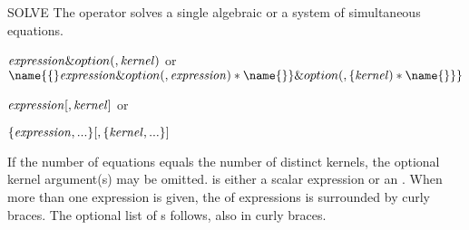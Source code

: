 \begin{Operator}{SOLVE}
The  operator solves a single algebraic  or a
system of simultaneous equations.
\begin{TEX}
\begin{Syntax}
\(\meta{expression}\&option(, \meta{kernel})\) or \\
 \(\name{\{}\meta{expression}\&option( ,\meta{expression})
 \optional\name{\}}
	  \&option(,\{\meta{kernel})\optional\name{\}\}}\)
\end{Syntax}
\end{TEX}
\begin{INFO}
{\begin{Syntax}
\(\meta{expression} [ , \meta{kernel}]\) or

\(\{\meta{expression},...\} [ ,\{ \meta{kernel} ,...\}] \)
\end{Syntax} 
}\end{INFO}

If the number of equations equals the number of distinct kernels, the
optional kernel argument(s) may be omitted.   is either a
scalar expression or an .  
When more than one expression is given,
the  of expressions is surrounded by curly braces.
The optional list
of s follows, also in curly braces.


\end{Operator}
